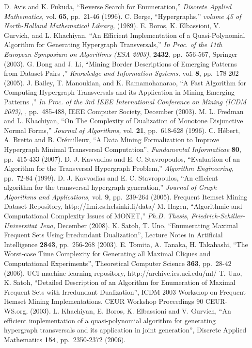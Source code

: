 \begin{thebibliography}{99}
 D. Avis and K. Fukuda, 
``Reverse Search for Enumeration,''
{\it Discrete Applied Mathematics,} vol. {\bf 65}, pp.~21-46 (1996).
 C. Berge,
``Hypergraphs,''
{\it volume 45 of North-Holland Mathematical Library,} (1989).
 E. Boros, K. Elbassioni, V. Gurvich, and L. Khachiyan,
``An Efficient Implementation of a Quasi-Polynomial Algorithm
for Generating Hypergraph Transversals,''
{\it In Proc. of the 11th European Symposium on Algorithms (ESA 2003)},
{\bf 2432}, pp.~556-567, Springer (2003).
 G. Dong and J. Li,
``Mining Border Descriptions of Emerging Patterns from Dataset Pairs ,''
{\it Knowledge and Information Systems,} vol. {\bf 8}, pp.~178-202 (2005).
 J. Bailey, T. Manoukian, and K. Ramamohanarao,
``A Fast Algorithm for Computing Hypergraph Transversals and its Application in Mining Emerging Patterns ,''
{\it In Proc. of the 3rd IEEE International Conference on Mining (ICDM 2003),} , pp.~485-488, 
IEEE Computer Society, December (2003).
 M. L. Fredman and L. Khachiyan,
``On The Complexity of Dualization of Monotone Disjunctive Normal Forms,''
{\it Journal of Algorithms,} vol. {\bf 21}, pp.~618-628 (1996).
 C. H\'ebert, A. Bretto and B. Cr\'emilleux,
``A Data Mining Formalization to Improve Hypergraph Minimal
Transversal Computation'',
{\it Fundamental Informaticae} {\bf 80}, pp.~415-433 (2007).
 D. J. Kavvadias and E. C. Stavropoulos,
``Evaluation of an Algorithm for the Transversal Hypergraph Problem,''
{\it Algorithm Engineering,} pp.~72-84 (1999).
 D. J. Kavvadias and E. C. Stavropoulos,
``An efficient algorithm for the transversal hypergraph generation,''
{\it Journal of Graph Algorithms and Applications,} vol. {\bf 9}, pp.~239-264 (2005).
 Frequent Itemset Mining Dataset Repository, http://fimi.cs.helsinki.fi/data/
 M. Hagen,
``Algorithmic and Computational Complexity Issues of MONET,''
{\it Ph.D. Thesis, Friedrich-Schiller-Universitat Jena,} December (2008).
 K. Satoh, T. Uno, 
``Enumerating Maximal Frequent Sets Using Irredundant Dualization'',
Lecture Notes in Artificial Intelligence {\bf 2843}, pp.~256-268 (2003).
 E. Tomita, A. Tanaka, H. Takahashi,
``The Worst-case Time Complexity for Generating all Maximal Cliques and
Computational Experiments'',
Theoretical Computer Science {\bf 363}, pp.~28-42 (2006).
 UCI machine learning repository, http://archive.ics.uci.edu/ml/
 T. Uno, K. Satoh,
``Detailed Description of an Algorithm for Enumeration of Maximal
Frequent Sets with Irredundant Dualization'', ICDM 2003 Workshop on
Frequent Itemset Mining Implementations, CEUR Workshop Proceedings
90 CEUR-WS.org, (2003).
 L. Khachiyan, E. Boros, K. Elbassioni and V. Gurvich,
 ``An efficient implementation of a quasi-polynomial algorithm for generating
hypergraph transversals and its application in joint generation'',
 Discrete Applied Mathematics {\bf 154}, pp.~2350-2372 (2006).

\end{thebibliography}




